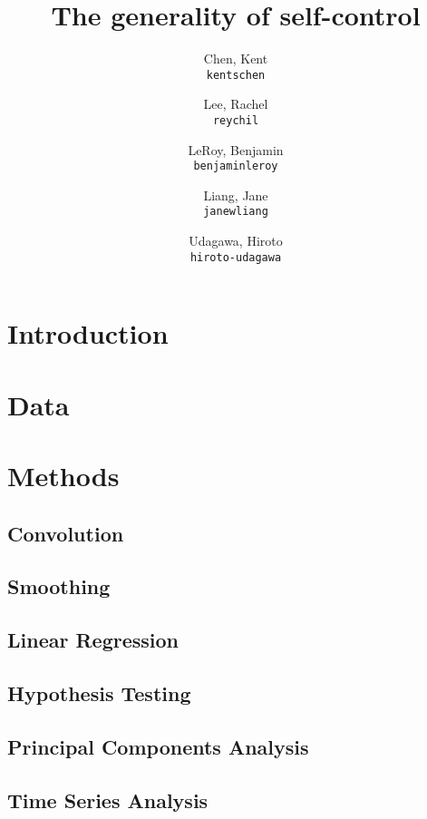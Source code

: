 \documentclass[11pt]{article}
\title{The generality of self-control}
\author{
  Chen, Kent\\
  \texttt{kentschen}
  \and
  Lee, Rachel\\
  \texttt{reychil}
  \and
  LeRoy, Benjamin\\
  \texttt{benjaminleroy}
  \and
  Liang, Jane\\
  \texttt{janewliang}
  \and
  Udagawa, Hiroto\\
  \texttt{hiroto-udagawa}
}
\begin{document}
\maketitle

\abstract{}

\section{Introduction}
	

\section{Data}

	
	
\section{Methods}

	\subsection{Convolution}
		
	\subsection{Smoothing}
	
		
		
	\subsection{Linear Regression}
	
		
		
	\subsection{Hypothesis Testing}
	
		
		
	\subsection{Principal Components Analysis}
	
		
		
	\subsection{Time Series Analysis}
	
\end{document}
